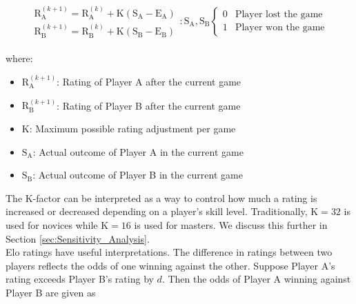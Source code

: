 \documentclass[letterpaper, 12pt]{article}
\begin{document}
            \begin{align}
                \begin{split}
                    \text{R}^{(k + 1)}_{\text{A}} = \text{R}^{(k)}_{\text{A}} + \text{K}(\text{S}_{\text{A}} - \text{E}_{\text{A}}) \\
                    \text{R}^{(k + 1)}_{\text{B}} = \text{R}^{(k)}_{\text{B}} + \text{K}(\text{S}_{\text{B}} - \text{E}_{\text{B}}) 
                \end{split}
                : \text{S}_{\text{A}}, \text{S}_{\text{B}} \begin{cases} 0 & \text{Player lost the game} \\ 1 & \text{Player won the game} 
                \end{cases} \label{eq:Elo_Update_Formula}
            \end{align}

            \noindent
            where:
            \begin{itemize}[itemsep=0.1em, label=]
                \item $\text{R}^{(k + 1)}_{\text{A}}$: Rating of Player A after the current game
                \item $\text{R}^{(k + 1)}_{\text{B}}$: Rating of Player B after the current game
                \item $\text{K}$: Maximum possible rating adjustment per game
                \item $\text{S}_{\text{A}}$: Actual outcome of Player A in the current game
                \item $\text{S}_{\text{B}}$: Actual outcome of Player B in the current game
            \end{itemize}
                        
            \noindent 
            The K-factor can be interpreted as a way to control how much a rating is increased or decreased depending on a player's skill level. Traditionally, $\text{K} = 32$ is used for novices while $\text{K} = 16$ is used for masters. We discuss this further in Section \ref{sec:Sensitivity_Analysis}. \\

            \noindent
            Elo ratings have useful interpretations. The difference in ratings between two players reflects the odds of one winning against the other. Suppose Player A's rating exceeds Player B's rating by $d$. Then the odds of Player A winning against Player B are given as 
\end{document}
